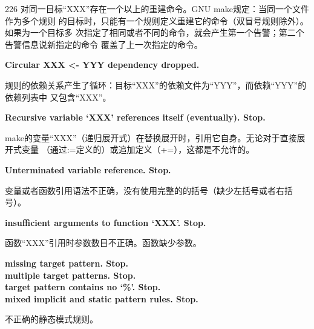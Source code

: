 \begin{dinglist}{226}
对同一目标“XXX”存在一个以上的重建命令。GNU make规定：当同一个文件作为多个规则
的目标时，只能有一个规则定义重建它的命令（双冒号规则除外）。如果为一个目标多
次指定了相同或者不同的命令，就会产生第一个告警；第二个告警信息说新指定的命令
覆盖了上一次指定的命令。

  \item \begin{minipage}[t]{\linewidth}
          \textbf{Circular XXX <- YYY dependency dropped.}
        \end{minipage}

规则的依赖关系产生了循环：目标“XXX”的依赖文件为“YYY”，而依赖“YYY”的依赖列表中
又包含“XXX”。

  \item \begin{minipage}[t]{\linewidth}
          \textbf{Recursive variable `XXX' references itself (eventually). Stop.}
        \end{minipage}

make的变量“XXX”（递归展开式）在替换展开时，引用它自身。无论对于直接展开式变量
（通过:=定义的）或追加定义（+=），这都是不允许的。

  \item \begin{minipage}[t]{\linewidth}
          \textbf{Unterminated variable reference. Stop.}
        \end{minipage}

变量或者函数引用语法不正确，没有使用完整的的括号（缺少左括号或者右括号）。

  \item \begin{minipage}[t]{\linewidth}
          \textbf{insufficient arguments to function `XXX'. Stop.}
        \end{minipage}

函数“XXX”引用时参数数目不正确。函数缺少参数。

  \item \begin{minipage}[t]{\linewidth}
          \textbf{missing target pattern. Stop.} \\
          \textbf{multiple target patterns. Stop.} \\
          \textbf{target pattern contains no `\%'. Stop.} \\
          \textbf{mixed implicit and static pattern rules.  Stop.}
        \end{minipage}

不正确的静态模式规则。


\end{dinglist}
